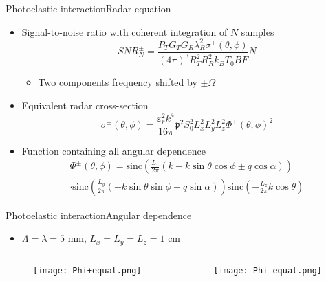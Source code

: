 \documentclass[11pt]{beamer}
\begin{document}
	\begin{frame}{Photoelastic interaction}{Radar equation}
		\pause
		\begin{itemize}
			\item Signal-to-noise ratio with coherent integration of $N$ samples
			\begin{equation*}
				\textit{SNR}^\pm_N = \frac{P_T G_T G_R \lambda_R^2 \sigma^\pm (\theta,\phi)}{(4\pi)^3 R_T^2 R_R^2 k_B T_0 B F} N
			\end{equation*}
			\begin{itemize}
				\item Two components frequency shifted by $\pm \Omega$
			\end{itemize} \pause
			\item Equivalent radar cross-section
			\begin{equation*}
				\sigma^\pm (\theta, \phi) = \frac{\varepsilon_r^2 k^4}{16\pi} \mathfrak{p}^2 S_0^2 L_x^2 L_y^2 L_z^2 \Phi^\pm (\theta,\phi)^2
			\end{equation*} \pause
			\item Function containing all angular dependence
			\begin{multline*}
				\Phi^\pm(\theta,\phi) = \text{sinc} \left( \frac{L_x}{2\pi} \left( k - k\sin{\theta}\cos{\phi} \pm q\cos{\alpha} \right) \right) \\
				\cdot \text{sinc} \left( \frac{L_y}{2\pi} \left( -k\sin{\theta}\sin{\phi} \pm q\sin{\alpha} \right) \right) 
				\text{sinc} \left( -\frac{L_z}{2\pi} k\cos{\theta} \right)
			\end{multline*}
		\end{itemize}
	\end{frame}
	
	\begin{frame}{Photoelastic interaction}{Angular dependence}
		\begin{itemize}
			\item $\Lambda = \lambda = 5$ mm, $L_x = L_y = L_z = 1$ cm
		\end{itemize}
		\begin{columns}
			\begin{column}{0.5\textwidth}
				\begin{figure}
					\centering
					\texttt{[image: Phi+equal.png]}
				\end{figure}
			\end{column}
			\begin{column}{0.5\textwidth}
				\begin{figure}
					\centering
					\texttt{[image: Phi-equal.png]}
				\end{figure}
			\end{column}
		\end{columns}
	\end{frame}
	
\end{document}
